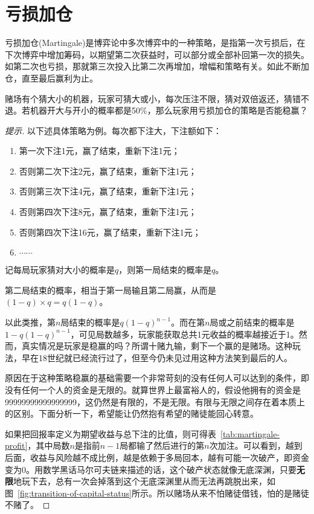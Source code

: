 \section{亏损加仓}
\label{sec:Martingale}

亏损加仓(Martingale)是博弈论中多次博弈中的一种策略，是指第一次亏损后，在下次博弈中增加筹码，以期望第二次获益时，可以部分或全部补回第一次的损失。如第二次也亏损，那就第三次投入比第二次再增加，增幅和策略有关。如此不断加仓，直至最后赢利为止。

\begin{example}
  赌场有个猜大小的机器，玩家可猜大或小，每次压注不限，猜对双倍返还，猜错不退。若机器开大与开小的概率都是50\%，那么玩家用亏损加仓的策略是否能稳赢？
\end{example}
\begin{proof}[提示]
  以下述具体策略为例。每次都下注大，下注额如下：
  \begin{enumerate}
  \item 第一次下注1元，赢了结束，重新下注1元；
  \item 否则第二次下注2元，赢了结束，重新下注1元；
  \item 否则第三次下注4元，赢了结束，重新下注1元；
  \item 否则第四次下注8元，赢了结束，重新下注1元；
  \item 否则第四次下注16元，赢了结束，重新下注1元；
  \item $\cdots\cdots$
  \end{enumerate}

  记每局玩家猜对大小的概率是$q$，则第一局结束的概率是$q$。

  第二局结束的概率，相当于第一局输且第二局赢，从而是$(1-q)\times q=q(1-q)$。

  以此类推，第$n$局结束的概率是$q(1-q)^{n-1}$。而在第$n$局或之前结束的概率是$1-q(1-q)^{n-1}$，可见局数越多，玩家能获取总共1元收益的概率越接近于1。然而，真实情况是玩家是稳赢的吗？所谓十赌九输，剩下一个赢的是赌场。这种玩法，早在18世纪就已经流行过了，但至今仍未见过用这种方法笑到最后的人。

  原因在于这种策略稳赢的基础需要一个非常苛刻的没有任何人可以达到的条件，即没有任何一个人的资金是无限的。就算世界上最富裕人的，假设他拥有的资金是99999999999999999，这仍然是有限的，不是无限。有限与无限之间存在着本质上的区别。下面分析一下，希望能让仍然抱有希望的赌徒能回心转意。

  如果把回报率定义为期望收益与总下注的比值，则可得表~\ref{tab:martingale-profit}，其中局数$n$是指前$n-1$局都输了然后进行的第$n$次加注。可以看到，越到后面，收益与风险越不成比例，越是依赖于多局回本，越有可能一次破产，即资金变为0。用数学黑话马尔可夫链来描述的话，这个破产状态就像无底深渊，只要{\bfseries 无限}地玩下去，总有一次会掉落到这个无底深渊里从而无法再跳脱出来，如图~\ref{fig:transition-of-capital-status}所示。所以赌场从来不怕赌徒借钱，怕的是赌徒不赌了。


\end{proof}
